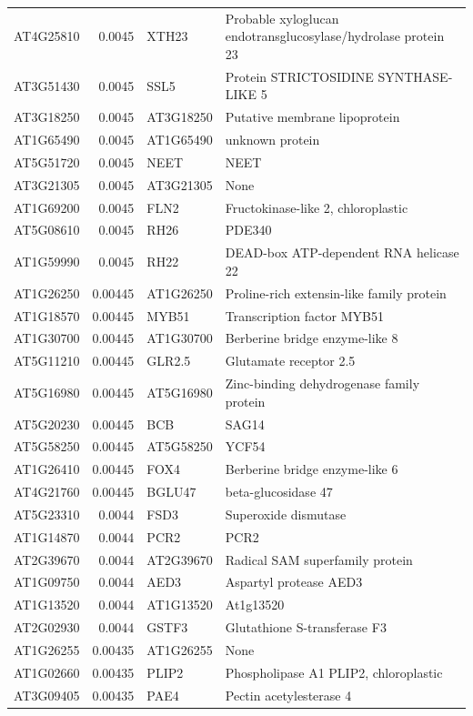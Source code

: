 \documentclass[11pt]{article}
\begin{document}
\begin{center}
\begin{tabular}{lrll}
AT4G25810 & 0.0045 & XTH23 & Probable xyloglucan endotransglucosylase/hydrolase protein 23\\
AT3G51430 & 0.0045 & SSL5 & Protein STRICTOSIDINE SYNTHASE-LIKE 5\\
AT3G18250 & 0.0045 & AT3G18250 & Putative membrane lipoprotein\\
AT1G65490 & 0.0045 & AT1G65490 & unknown protein\\
AT5G51720 & 0.0045 & NEET & NEET\\
AT3G21305 & 0.0045 & AT3G21305 & None\\
AT1G69200 & 0.0045 & FLN2 & Fructokinase-like 2, chloroplastic\\
AT5G08610 & 0.0045 & RH26 & PDE340\\
AT1G59990 & 0.0045 & RH22 & DEAD-box ATP-dependent RNA helicase 22\\
AT1G26250 & 0.00445 & AT1G26250 & Proline-rich extensin-like family protein\\
AT1G18570 & 0.00445 & MYB51 & Transcription factor MYB51\\
AT1G30700 & 0.00445 & AT1G30700 & Berberine bridge enzyme-like 8\\
AT5G11210 & 0.00445 & GLR2.5 & Glutamate receptor 2.5\\
AT5G16980 & 0.00445 & AT5G16980 & Zinc-binding dehydrogenase family protein\\
AT5G20230 & 0.00445 & BCB & SAG14\\
AT5G58250 & 0.00445 & AT5G58250 & YCF54\\
AT1G26410 & 0.00445 & FOX4 & Berberine bridge enzyme-like 6\\
AT4G21760 & 0.00445 & BGLU47 & beta-glucosidase 47\\
AT5G23310 & 0.0044 & FSD3 & Superoxide dismutase\\
AT1G14870 & 0.0044 & PCR2 & PCR2\\
AT2G39670 & 0.0044 & AT2G39670 & Radical SAM superfamily protein\\
AT1G09750 & 0.0044 & AED3 & Aspartyl protease AED3\\
AT1G13520 & 0.0044 & AT1G13520 & At1g13520\\
AT2G02930 & 0.0044 & GSTF3 & Glutathione S-transferase F3\\
AT1G26255 & 0.00435 & AT1G26255 & None\\
AT1G02660 & 0.00435 & PLIP2 & Phospholipase A1 PLIP2, chloroplastic\\
AT3G09405 & 0.00435 & PAE4 & Pectin acetylesterase 4\\

\end{tabular}
\end{center}
\end{document}
